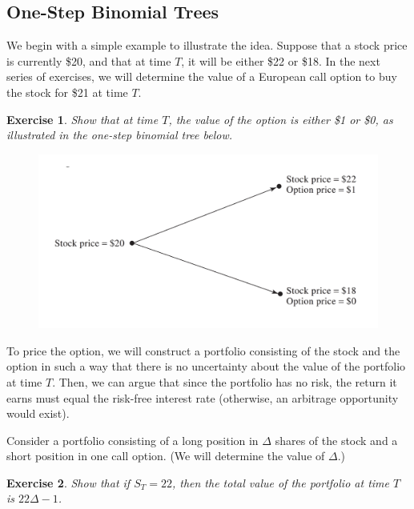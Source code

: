 \documentclass[letterpaper,10pt]{article}
\newtheorem{ex}{Exercise}
\begin{document}
\bigskip

\subsection{One-Step Binomial Trees}

We begin with a simple example to illustrate the idea.  Suppose that a stock price is currently \$20, and that at time $T$, it will be either \$22 or \$18.  In the next series of exercises, we will determine the value of a European call option to buy the stock for \$21 at time $T$. 



\begin{ex}
Show that at time $T$, the value of the option is either \$1 or \$0, as illustrated in the {\em one-step binomial tree} below.
\end{ex}

\begin{center}
\begin{figure}[H]
\includegraphics[scale=0.3]{tree-ex.png}
\end{figure}
\end{center}

To price the option, we will construct a portfolio consisting of the stock and the option in such a way that there is no uncertainty about the value of the portfolio at time $T$.  Then, we can argue that since the portfolio has no risk, the return it earns must equal the risk-free interest rate (otherwise, an arbitrage opportunity would exist).

Consider a portfolio consisting of a long position in $\Delta$ shares of the stock and a short position in one call option.  (We will determine the value of $\Delta$.)

\begin{ex}
Show that if $S_T=22$, then the total value of the portfolio at time $T$ is $22\Delta-1$.
\end{ex}
\end{document}

